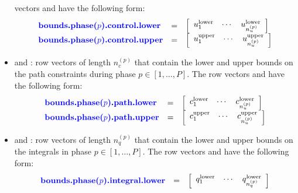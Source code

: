 \documentclass[10pt]{article}
\newcommand{\bfblue}[1]{\textrm{{\color{blue}{\bf #1}}}}
\begin{document}
\begin{itemize}
vectors \bfblue{bounds.phase($p$).control.lower} and
\bfblue{bounds.phase($p$).control.upper} have the following form:
\begin{displaymath}
 \begin{array}{lcl}
   \bfblue{bounds.phase($p$).control.lower} & = &
  \left[\begin{array}{ccc} u_{1}^{\textrm{lower}} & \cdots & u_{n_u^{(p)}}^{\textrm{lower}}\end{array}\right] \\
   \bfblue{bounds.phase($p$).control.upper} & = &
  \left[\begin{array}{ccc} u_{1}^{\textrm{upper}} & \cdots & u_{n_u^{(p)}}^{\textrm{upper}}\end{array}\right]
\end{array}
\end{displaymath}
\item \bfblue{bounds.phase($p$).path.lower} and \bfblue{bounds.phase($p$).path.upper}:
row vectors of length $n_c^{(p)}$ that contain the lower and upper
bounds on the path constraints during phase $p\in[1,\ldots,P]$.  The row
vectors \bfblue{bounds.phase($p$).path.lower} and
\bfblue{bounds.phase($p$).path.upper} have the following form:
\begin{displaymath}
 \begin{array}{lcl}
   \bfblue{bounds.phase($p$).path.lower} & = &
  \left[\begin{array}{ccc} c_{1}^{\textrm{lower}} & \cdots & c_{n_u^{(p)}}^{\textrm{lower}}\end{array}\right] \\
   \bfblue{bounds.phase($p$).path.upper} & = &
  \left[\begin{array}{ccc} c_{1}^{\textrm{upper}} & \cdots & c_{n_u^{(p)}}^{\textrm{upper}}\end{array}\right]
\end{array}
\end{displaymath}
\item \bfblue{bounds.phase($p$).integral.lower} and \bfblue{bounds.phase($p$).integral.upper}:
row vectors of length $n_q^{(p)}$ that contain the lower and upper
bounds on the integrals in phase $p\in[1,\ldots,P]$.  The row
vectors \bfblue{bounds.phase($p$).integral.lower} and
\bfblue{bounds.phase($p$).integral.upper} have the following form:
\begin{displaymath}
 \begin{array}{lcl}
   \bfblue{bounds.phase($p$).integral.lower} & = &
  \left[\begin{array}{ccc} q_{1}^{\textrm{lower}} & \cdots & q_{n_q^{(p)}}^{\textrm{lower}}\end{array}\right] \\

\end{array}
\end{displaymath}
\end{itemize}
\end{document}
